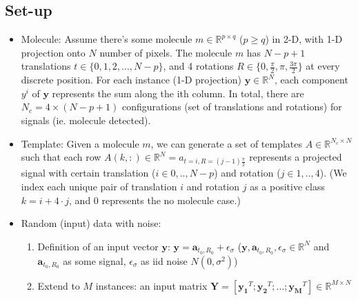 \documentclass[11pt]{article}
\newcommand{\R}{\mathbb{R}}
\begin{document}
\subsection{Set-up}
\begin{itemize}
    \item Molecule: Assume there's some molecule $m \in \R^{p \times q}$ ($p\ge q$) in 2-D, with 1-D projection onto $N$ number of pixels. The molecule $m$ has $N-p+1$ translations $t \in \{0,1,2,...,N-p\}$, and 4 rotations $R \in \{0, \frac{\pi}{2}, \pi, \frac{3\pi}{2}\}$ at every discrete position. For each instance (1-D projection) $\mathbf{y} \in \R^N$, each component $y^i$ of $\mathbf{y}$ represents the sum along the ith column. In total, there are $N_c = 4\times(N-p+1)$ configurations (set of translations and rotations) for signals (ie. molecule detected). 
    \item Template: Given a molecule $m$, we can generate a set of templates $A \in \R^{N_c \times N}$ such that each row $A(k,:) \in \R^N = a_{t=i, R=(j-1)\frac{\pi}{2}}$ represents a projected signal with certain translation ($i \in {0,..,N-p}$) and rotation ($j \in {1,..,4}$). (We index each unique pair of translation $i$ and rotation $j$ as a positive class $k=i+4\cdot j$, and $0$ represents the no molecule case.)
    \item Random (input) data with noise:
    \begin{enumerate}
        \item Definition of an input vector $\mathbf{y}$: $\mathbf{y} =  \mathbf{a}_{t_0,R_0} + \epsilon_\sigma$ ($\mathbf{y}, \mathbf{a}_{t_0,R_0}, \epsilon_\sigma \in \R^N$ and $ \mathbf{a}_{t_0,R_0}$ as some signal, $\epsilon_\sigma$ as iid noise $N(0, \sigma^2)$)
        \item Extend to $M$ instances: an input matrix $\mathbf{Y} = [\mathbf{y_1}^T; \mathbf{y_2}^T; ...; \mathbf{y_M}^T] \in \R^{M\times N}$
    \end{enumerate}
    \end{itemize}
    
\end{document}
